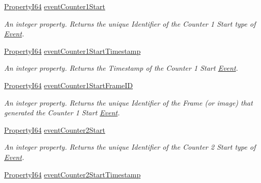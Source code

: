 \begin{DoxyCompactItemize}
\hyperlink{group___common_interface_ga81749b2696755513663492664a18a893}{Property\+I64} \hyperlink{classmv_i_m_p_a_c_t_1_1acquire_1_1_gen_i_cam_1_1_event_control_a0e32c51eb01207b0bb4f656aa4eaca71}{event\+Counter1\+Start}
\begin{DoxyCompactList}\small\item\em An integer property. Returns the unique Identifier of the Counter 1 Start type of \hyperlink{classmv_i_m_p_a_c_t_1_1acquire_1_1_event}{Event}. \end{DoxyCompactList}\item 
\hyperlink{group___common_interface_ga81749b2696755513663492664a18a893}{Property\+I64} \hyperlink{classmv_i_m_p_a_c_t_1_1acquire_1_1_gen_i_cam_1_1_event_control_a6f840e03c44c57ec85ca2ae95938eef0}{event\+Counter1\+Start\+Timestamp}
\begin{DoxyCompactList}\small\item\em An integer property. Returns the Timestamp of the Counter 1 Start \hyperlink{classmv_i_m_p_a_c_t_1_1acquire_1_1_event}{Event}. \end{DoxyCompactList}\item 
\hyperlink{group___common_interface_ga81749b2696755513663492664a18a893}{Property\+I64} \hyperlink{classmv_i_m_p_a_c_t_1_1acquire_1_1_gen_i_cam_1_1_event_control_a4920e5ce3e443f6237739c19c20a6714}{event\+Counter1\+Start\+Frame\+I\+D}
\begin{DoxyCompactList}\small\item\em An integer property. Returns the unique Identifier of the Frame (or image) that generated the Counter 1 Start \hyperlink{classmv_i_m_p_a_c_t_1_1acquire_1_1_event}{Event}. \end{DoxyCompactList}\item 
\hyperlink{group___common_interface_ga81749b2696755513663492664a18a893}{Property\+I64} \hyperlink{classmv_i_m_p_a_c_t_1_1acquire_1_1_gen_i_cam_1_1_event_control_ae7e6a99ce8b6d55496162441a595fbc4}{event\+Counter2\+Start}
\begin{DoxyCompactList}\small\item\em An integer property. Returns the unique Identifier of the Counter 2 Start type of \hyperlink{classmv_i_m_p_a_c_t_1_1acquire_1_1_event}{Event}. \end{DoxyCompactList}\item 
\hyperlink{group___common_interface_ga81749b2696755513663492664a18a893}{Property\+I64} \hyperlink{classmv_i_m_p_a_c_t_1_1acquire_1_1_gen_i_cam_1_1_event_control_a5704b9998f9c86ece2bdfa825b7e3216}{event\+Counter2\+Start\+Timestamp}

\end{DoxyCompactItemize}
